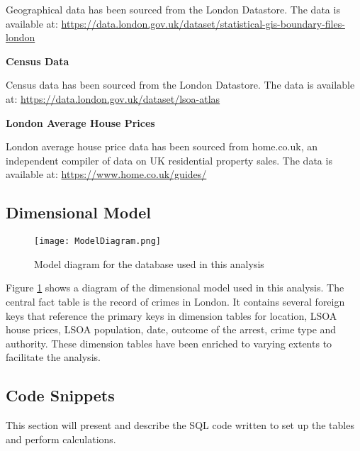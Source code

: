 \documentclass{article}
\begin{document}
Geographical data has been sourced from the London Datastore. The data is available at:
\newline
\href{url}{https://data.london.gov.uk/dataset/statistical-gis-boundary-files-london}
\newline

\noindent
\textbf{Census Data}

Census data has been sourced from the London Datastore. The data is available at:
\newline
\href{url}{https://data.london.gov.uk/dataset/lsoa-atlas}
\newline

\noindent
\textbf{London Average House Prices}

London average house price data has been sourced from home.co.uk, an independent compiler of data on UK residential property
sales. The data is available at:
\newline
\href{url}{https://www.home.co.uk/guides/}

\newpage
\subsection{Dimensional Model}

\begin{figure}[H]
\begin{center}
  \texttt{[image: ModelDiagram.png]}
  \caption{Model diagram for the database used in this analysis}
  \label{fig:ModelDiagram}
\end{center}
\end{figure}

Figure \ref{fig:ModelDiagram} shows a diagram of the dimensional model used in this analysis. The central fact table is the record of crimes in London. It contains several foreign keys that reference the primary keys in dimension tables for location, LSOA house prices, LSOA population, date, outcome of the arrest, crime type and authority. These dimension tables have been enriched to varying extents to facilitate the analysis.

\newpage
\subsection{Code Snippets}

This section will present and describe the SQL code written to set up the tables and perform calculations.
\newline
\end{document}
